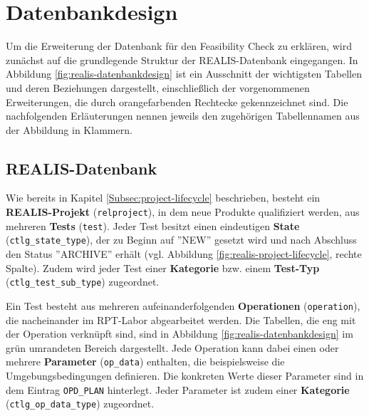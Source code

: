 \section{Datenbankdesign}
Um die Erweiterung der Datenbank für den Feasibility Check zu erklären, wird zunächst auf die grundlegende Struktur der REALIS-Datenbank eingegangen. In Abbildung \ref{fig:realis-datenbankdesign} ist ein Ausschnitt der wichtigsten Tabellen und deren Beziehungen dargestellt, einschließlich der vorgenommenen Erweiterungen, die durch orangefarbenden Rechtecke gekennzeichnet sind. Die nachfolgenden Erläuterungen nennen jeweils den zugehörigen Tabellennamen aus der Abbildung in Klammern.

\subsection{REALIS-Datenbank}

Wie bereits in Kapitel \ref{Subsec:project-lifecycle} beschrieben, besteht ein \textbf{REALIS-Projekt} (\texttt{relproject}), in dem neue Produkte qualifiziert werden, aus mehreren \textbf{Tests} (\texttt{test}). Jeder Test besitzt einen eindeutigen \textbf{State} (\texttt{ctlg\_state\_type}), der zu Beginn auf ''NEW'' gesetzt wird und nach Abschluss den Status ''ARCHIVE'' erhält (vgl. Abbildung \ref{fig:realis-project-lifecycle}, rechte Spalte). Zudem wird jeder Test einer \textbf{Kategorie} bzw. einem \textbf{Test-Typ} (\texttt{ctlg\_test\-\_sub\_type}) zugeordnet.

Ein Test besteht aus mehreren aufeinanderfolgenden \textbf{Operationen} (\texttt{operation}), die nacheinander im \gls{RPT}-Labor abgearbeitet werden. Die Tabellen, die eng mit der Operation verknüpft sind, sind in Abbildung \ref{fig:realis-datenbankdesign} im grün umrandeten Bereich dargestellt. Jede Operation kann dabei einen oder mehrere \textbf{Parameter} (\texttt{op\_data}) enthalten, die beispielsweise die Umgebungsbedingungen definieren. Die konkreten Werte dieser Parameter sind in dem Eintrag \texttt{OPD\_PLAN} hinterlegt. Jeder Parameter ist zudem einer \textbf{Kategorie} (\texttt{ctlg\_op\_\-data\_type}) zugeordnet.  


